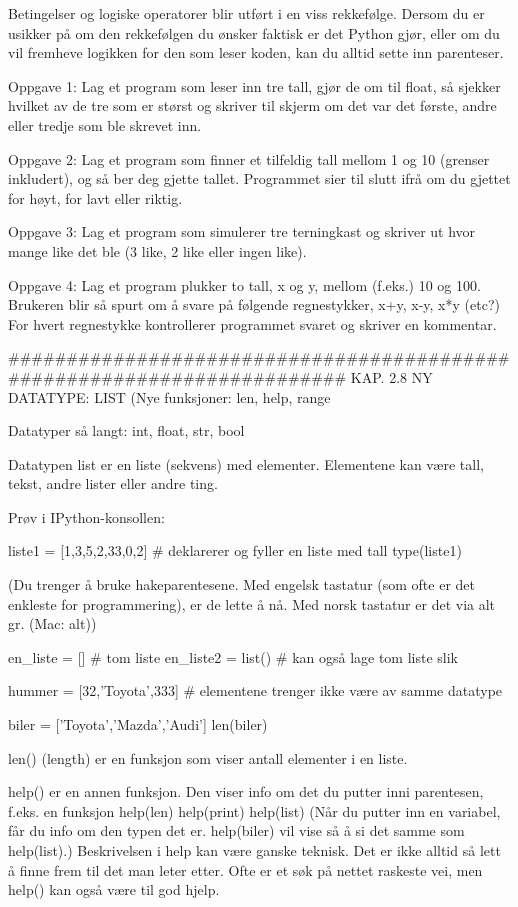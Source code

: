 {Betingelser og logiske operatorer blir utført i en viss rekkefølge.
Dersom du er usikker på om den rekkefølgen du ønsker faktisk er det Python gjør,
eller om du vil fremheve logikken for den som leser koden, 
kan du alltid sette inn parenteser.



Oppgave 1: Lag et program som leser inn tre tall, gjør de om til float, 
så sjekker hvilket av de tre som er størst og skriver til skjerm om
det var det første, andre eller tredje som ble skrevet inn. 


Oppgave 2: Lag et program som finner et tilfeldig tall mellom 1 og 10
(grenser inkludert), og så ber deg gjette tallet.
Programmet sier til slutt ifrå om du gjettet for høyt, for lavt eller riktig. 


Oppgave 3: Lag et program som simulerer tre terningkast og skriver ut hvor mange
like det ble (3 like, 2 like eller ingen like). 


Oppgave 4: Lag et program plukker to tall, x og y, mellom (f.eks.) 10 og 100. 
Brukeren blir så spurt om å svare på følgende regnestykker, x+y, x-y, x*y (etc?) 
For hvert regnestykke kontrollerer programmet svaret og skriver en kommentar. 

######################################################################## 
KAP. 2.8  NY DATATYPE: LIST
(Nye funksjoner: len, help, range

Datatyper så langt: int, float, str, bool


Datatypen list er en liste (sekvens) med elementer. 
Elementene kan være tall, tekst, andre lister eller andre ting.

Prøv i IPython-konsollen:

liste1 = [1,3,5,2,33,0,2]  # deklarerer og fyller en liste med tall
type(liste1)

(Du trenger å bruke hakeparentesene. 
Med engelsk tastatur (som ofte er det enkleste for programmering), 
er de lette å nå. Med norsk tastatur er det via alt gr. (Mac: alt)) 

en_liste = []        # tom liste
en_liste2 = list()   # kan også lage tom liste slik

hummer = [32,'Toyota',333]   # elementene trenger ikke være av samme datatype

biler = ['Toyota','Mazda','Audi'] 
len(biler) 

len() (length) er en funksjon som viser antall elementer i en liste. 


help() er en annen funksjon. Den viser info om det du putter inni parentesen, 
f.eks. en funksjon
help(len)
help(print)
help(list)
(Når du putter inn en variabel, får du info om den typen det er. 
help(biler) vil vise så å si det samme som help(list).)  
Beskrivelsen i help kan være ganske teknisk. 
Det er ikke alltid så lett å finne frem til det man leter etter.
Ofte er et søk på nettet raskeste vei, men help() kan også være til god hjelp. 


}
